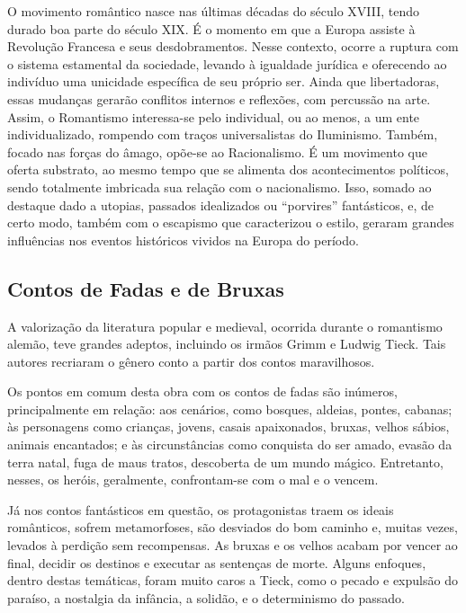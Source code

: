 \documentclass[12pt]{extarticle}
\begin{document}
O movimento romântico nasce nas últimas décadas do século XVIII, tendo
durado boa parte do século XIX. É o momento em que a Europa assiste à
Revolução Francesa e seus desdobramentos. Nesse contexto, ocorre a
ruptura com o sistema estamental da sociedade, levando à igualdade
jurídica e oferecendo ao indivíduo uma unicidade específica de seu
próprio ser. Ainda que libertadoras, essas mudanças gerarão conflitos
internos e reflexões, com percussão na arte. Assim, o Romantismo
interessa-se pelo individual, ou ao menos, a um ente individualizado,
rompendo com traços universalistas do Iluminismo. Também, focado nas
forças do âmago, opõe-se ao Racionalismo. É um movimento que oferta
substrato, ao mesmo tempo que se alimenta dos acontecimentos políticos,
sendo totalmente imbricada sua relação com o nacionalismo. Isso, somado
ao destaque dado a utopias, passados idealizados ou ``porvires''
fantásticos, e, de certo modo, também com o escapismo que caracterizou o
estilo, geraram grandes influências nos eventos históricos vividos na
Europa do período.

\subsection{Contos de Fadas e de Bruxas}

A valorização da literatura popular e medieval, ocorrida durante o
romantismo alemão, teve grandes adeptos, incluindo os irmãos Grimm e
Ludwig Tieck. Tais autores recriaram o gênero conto a partir dos contos
maravilhosos.

Os pontos em comum desta obra com os contos de fadas são inúmeros,
principalmente em relação: aos cenários, como bosques, aldeias, pontes,
cabanas; às personagens como crianças, jovens, casais apaixonados,
bruxas, velhos sábios, animais encantados; e às circunstâncias como
conquista do ser amado, evasão da terra natal, fuga de maus tratos,
descoberta de um mundo mágico. Entretanto, nesses, os heróis,
geralmente, confrontam-se com o mal e o vencem.

Já nos contos fantásticos em questão, os protagonistas traem os ideais
românticos, sofrem metamorfoses, são desviados do bom caminho e, muitas
vezes, levados à perdição sem recompensas. As bruxas e os velhos acabam
por vencer ao final, decidir os destinos e executar as sentenças de
morte. Alguns enfoques, dentro destas temáticas, foram muito caros a
Tieck, como o pecado e expulsão do paraíso, a nostalgia da infância, a
solidão, e o determinismo do passado.

\end{document}

